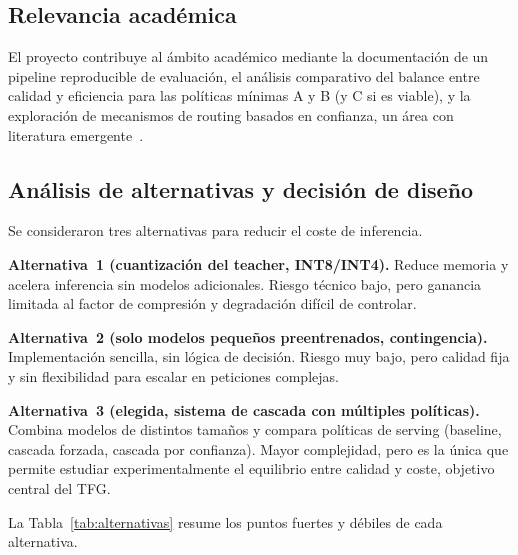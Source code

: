 \documentclass[11pt,a4paper]{article}
\begin{document}
\subsection{Relevancia académica}

El proyecto contribuye al ámbito académico mediante la documentación de un pipeline reproducible de evaluación, el análisis comparativo del balance entre calidad y eficiencia para las políticas mínimas A y B (y C si es viable), y la exploración de mecanismos de routing basados en confianza, un área con literatura emergente~\cite{chen2023frugalgpt, dekoninck2024routing}.

\subsection{Análisis de alternativas y decisión de diseño}

Se consideraron tres alternativas para reducir el coste de inferencia.

\textbf{Alternativa~1 (cuantización del teacher, INT8/INT4).} Reduce memoria y acelera inferencia sin modelos adicionales. Riesgo técnico bajo, pero ganancia limitada al factor de compresión y degradación difícil de controlar.

\textbf{Alternativa~2 (solo modelos pequeños preentrenados, contingencia).} Implementación sencilla, sin lógica de decisión. Riesgo muy bajo, pero calidad fija y sin flexibilidad para escalar en peticiones complejas.

\textbf{Alternativa~3 (elegida, sistema de cascada con múltiples políticas).} Combina modelos de distintos tamaños y compara políticas de serving (baseline, cascada forzada, cascada por confianza). Mayor complejidad, pero es la única que permite estudiar experimentalmente el equilibrio entre calidad y coste, objetivo central del TFG.

La Tabla~\ref{tab:alternativas} resume los puntos fuertes y débiles de cada alternativa.
\end{document}
